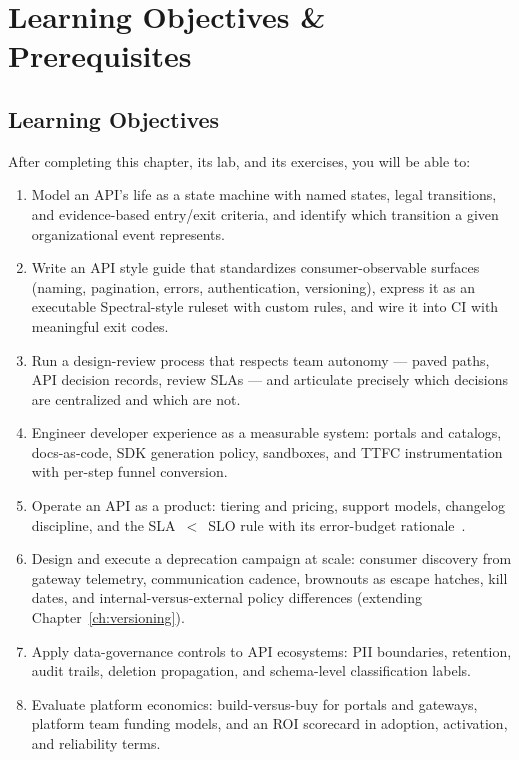 \section{Learning Objectives \& Prerequisites}
\label{sec:ch20-objectives}

\subsection*{Learning Objectives}
After completing this chapter, its lab, and its exercises, you will be able to:

\begin{enumerate}[label=\textbf{LO-\arabic*.}, leftmargin=2.6cm]
  \item Model an API's life as a state machine with named states, legal
        transitions, and evidence-based entry/exit criteria, and identify
        which transition a given organizational event represents.
  \item Write an API style guide that standardizes consumer-observable
        surfaces (naming, pagination, errors, authentication, versioning),
        express it as an executable Spectral-style ruleset with custom
        rules, and wire it into CI with meaningful exit codes.
  \item Run a design-review process that respects team autonomy ---
        paved paths, API decision records, review SLAs --- and articulate
        precisely which decisions are centralized and which are not.
  \item Engineer developer experience as a measurable system: portals and
        catalogs, docs-as-code, SDK generation policy, sandboxes, and
        TTFC instrumentation with per-step funnel conversion.
  \item Operate an API as a product: tiering and pricing, support models,
        changelog discipline, and the SLA~$<$~SLO rule with its
        error-budget rationale~\cite{beyer2016sre}.
  \item Design and execute a deprecation campaign at scale: consumer
        discovery from gateway telemetry, communication cadence, brownouts
        as escape hatches, kill dates, and internal-versus-external policy
        differences (extending Chapter~\ref{ch:versioning}).
  \item Apply data-governance controls to API ecosystems: PII boundaries,
        retention, audit trails, deletion propagation, and schema-level
        classification labels.
  \item Evaluate platform economics: build-versus-buy for portals and
        gateways, platform team funding models, and an ROI scorecard in
        adoption, activation, and reliability terms.
\end{enumerate}

